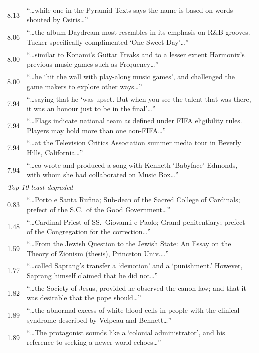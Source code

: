 \documentclass{article}
\begin{document}
\begin{table}[h]
\begin{tabularx}{\textwidth}{r >{\raggedright\arraybackslash}X}
8.13 & ``\ldots while one in the Pyramid Texts says the name is based on words shouted by Osiris\ldots'' \\
8.06 & ``\ldots the album Daydream most resembles in its emphasis on R\&B grooves. Tucker specifically complimented `One Sweet Day'\ldots'' \\
8.00 & ``\ldots similar to Konami's Guitar Freaks and to a lesser extent Harmonix's previous music games such as Frequency\ldots'' \\
8.00 & ``\ldots he `hit the wall with play-along music games', and challenged the game makers to explore other ways\ldots'' \\
7.94 & ``\ldots saying that he `was upset. But when you see the talent that was there, it was an honour just to be in the final'\ldots'' \\
7.94 & ``\ldots Flags indicate national team as defined under FIFA eligibility rules. Players may hold more than one non-FIFA\ldots'' \\
7.94 & ``\ldots at the Television Critics Association summer media tour in Beverly Hills, California\ldots'' \\
7.94 & ``\ldots co-wrote and produced a song with Kenneth `Babyface' Edmonds, with whom she had collaborated on Music Box\ldots'' \\
\midrule
\multicolumn{2}{l}{\emph{Top 10 least degraded}} \\
0.83 & ``\ldots Porto e Santa Rufina; Sub-dean of the Sacred College of Cardinals; prefect of the S.C.\ of the Good Government\ldots'' \\
1.48 & ``\ldots Cardinal-Priest of SS.\ Giovanni e Paolo; Grand penitentiary; prefect of the Congregation for the correction\ldots'' \\
1.59 & ``\ldots From the Jewish Question to the Jewish State: An Essay on the Theory of Zionism (thesis), Princeton Univ.\ldots'' \\
1.77 & ``\ldots called Saprang's transfer a `demotion' and a `punishment.' However, Saprang himself claimed that he did not\ldots'' \\
1.82 & ``\ldots the Society of Jesus, provided he observed the canon law; and that it was desirable that the pope should\ldots'' \\
1.89 & ``\ldots the abnormal excess of white blood cells in people with the clinical syndrome described by Velpeau and Bennett\ldots'' \\
1.89 & ``\ldots The protagonist sounds like a `colonial administrator', and his reference to seeking a newer world echoes\ldots'' \\

\end{tabularx}
\end{table}
\end{document}
